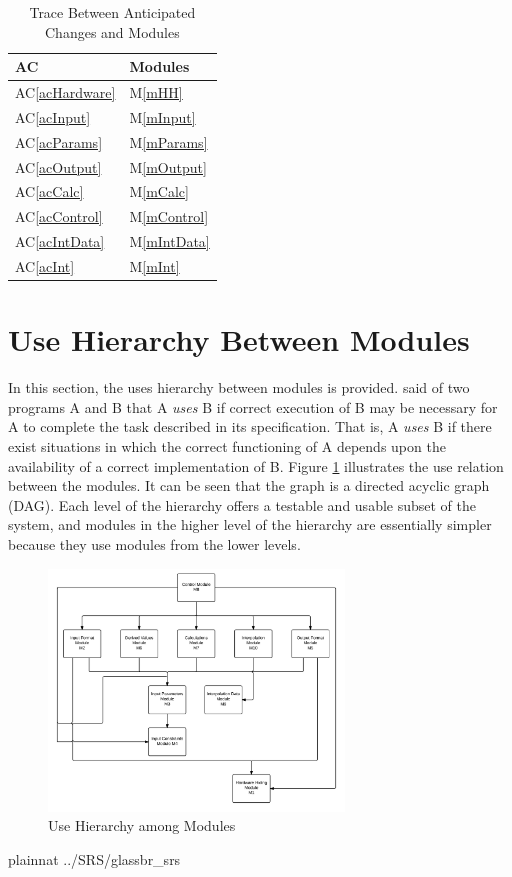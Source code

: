 \documentclass[12pt]{article}
\newcommand{\acref}[1]{AC\ref{#1}}
\newcommand{\mref}[1]{M\ref{#1}}
\begin{document}
\begin{table}[H]
\centering
\begin{tabular}{p{} p{}}
\toprule
\textbf{AC} & \textbf{Modules}\\
\midrule
\acref{acHardware} & \mref{mHH}\\
\acref{acInput} & \mref{mInput}\\
\acref{acParams} & \mref{mParams}\\
\acref{acOutput} & \mref{mOutput}\\
\acref{acCalc} & \mref{mCalc}\\
\acref{acControl} & \mref{mControl}\\
\acref{acIntData} & \mref{mIntData}\\
\acref{acInt} & \mref{mInt}\\
\bottomrule
\end{tabular}
\caption{Trace Between Anticipated Changes and Modules}
\label{TblAC}
\end{table}
\section{Use Hierarchy Between Modules} \label{SecUse}

In this section, the uses hierarchy between modules is
provided. \citet{Parnas1978} said of two programs A and B that A {\em uses} B if
correct execution of B may be necessary for A to complete the task described in
its specification. That is, A {\em uses} B if there exist situations in which
the correct functioning of A depends upon the availability of a correct
implementation of B.  Figure \ref{FigUH} illustrates the use relation between
the modules. It can be seen that the graph is a directed acyclic graph
(DAG). Each level of the hierarchy offers a testable and usable subset of the
system, and modules in the higher level of the hierarchy are essentially simpler
because they use modules from the lower levels.

\begin{figure}[H]
	\centering
	\includegraphics[width=0.7\textwidth]{UsesHierarchyGlassBR.png}
	\caption{Use Hierarchy among Modules}
	\label{FigUH}
\end{figure}


 {plainnat}
 {../SRS/glassbr_srs}
\end{document}
